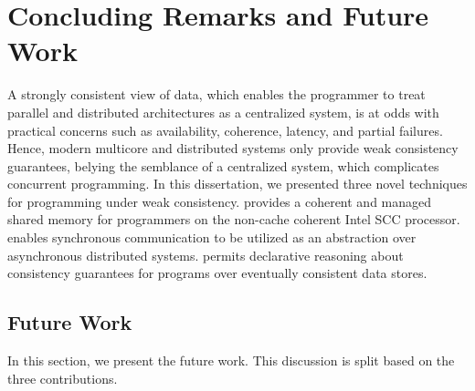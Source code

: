 \chapter{Concluding Remarks and Future Work}
\label{chap:conclusion}

A strongly consistent view of data, which enables the programmer to treat
parallel and distributed architectures as a centralized system, is at odds with
practical concerns such as availability, coherence, latency, and partial
failures. Hence, modern multicore and distributed systems only provide weak
consistency guarantees, belying the semblance of a centralized system, which
complicates concurrent programming. In this dissertation, we presented three
novel techniques for programming under weak consistency. \MMSCC provides a
coherent and managed shared memory for programmers on the non-cache coherent
Intel SCC processor. \rxcml enables synchronous communication to be utilized as
an abstraction over asynchronous distributed systems. \quelea permits
declarative reasoning about consistency guarantees for programs over eventually
consistent data stores.

\section{Future Work}

In this section, we present the future work. This discussion is split based on
the three contributions.

\subsection{\MMSCC}

\subsection{\rxcml}

\subsection{\quelea}
